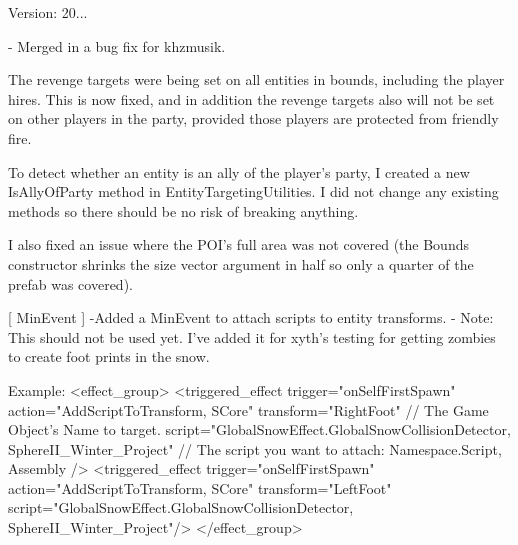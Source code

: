 Version\+: 20... \begin{DoxyVerb}
    - Merged in a bug fix for khzmusik.

    The revenge targets were being set on all entities in bounds, including the player hires. 
    This is now fixed, and in addition the revenge targets also will not be set on other players in the party, 
        provided those players are protected from friendly fire.

    To detect whether an entity is an ally of the player's party, I created a new IsAllyOfParty method in EntityTargetingUtilities. 
    I did not change any existing methods so there should be no risk of breaking anything.

    I also fixed an issue where the POI's full area was not covered (the Bounds constructor shrinks the size vector 
        argument in half so only a quarter of the prefab was covered).

[ MinEvent ] 
    -Added a MinEvent to attach scripts to entity transforms.
    - Note: This should not be used yet. I've added it for xyth's testing for getting zombies to create foot prints in the snow.

    Example:
        <effect_group>
            <triggered_effect trigger="onSelfFirstSpawn" 
                action="AddScriptToTransform, SCore" 
                transform="RightFoot"    // The Game Object's Name to target.
                script="GlobalSnowEffect.GlobalSnowCollisionDetector, SphereII_Winter_Project"  // The script you want to attach:  Namespace.Script, Assembly
            />
            <triggered_effect trigger="onSelfFirstSpawn" action="AddScriptToTransform, SCore" transform="LeftFoot" script="GlobalSnowEffect.GlobalSnowCollisionDetector, SphereII_Winter_Project"/>
        </effect_group>
\end{DoxyVerb}
